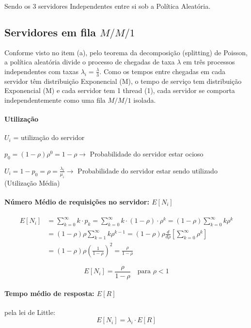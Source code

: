 \documentclass[conference]{IEEE_Conference_Template/IEEEtran}
\begin{document}
Sendo os 3 servidores Independentes entre si sob a Política Aleatória.

\subsection{Servidores em fila $M / M / 1$}

Conforme visto no item (a), pelo teorema da decomposição (splitting) de Poisson, a política aleatória divide o processo de chegadas de taxa $\lambda$ em três processos independentes com taxas $\lambda_i = \frac{\lambda}{3}$. Como os tempos entre chegadas em cada servidor têm distribuição Exponencial (M), o tempo de serviço tem distribuição Exponencial (M) e cada servidor tem 1 thread (1), cada servidor se comporta independentemente como uma fila $M/M/1$ isolada.

\paragraph{Utilização}
$U_i$ = utilização do servidor

$p_0 = (1 - \rho)\rho^0 = 1 - \rho \to$ Probabilidade do servidor estar ocioso

$U_i = 1 - p_0 = \rho = \frac{\lambda_i}{\mu_i} \to$ Probabilidade do servidor estar sendo utilizado (Utilização Média)

\paragraph{Número Médio de requisições no servidor: $E[N_i]$}
\begin{align}
E[N_i] &= \sum_{k=0}^{\infty} k \cdot p_k = \sum_{k=0}^{\infty} k \cdot (1 - \rho) \cdot \rho^k = (1 - \rho) \sum_{k=0}^{\infty} k \rho^k \nonumber\\
&= (1 - \rho)\rho \sum_{k=1}^{\infty} k \rho^{k-1} = (1 - \rho)\rho \frac{d}{d\rho} \left[ \sum_{k=0}^{\infty} \rho^k \right] \nonumber\\
&= (1 - \rho)\rho \left( \frac{1}{1-\rho} \right)^2 = \frac{\rho}{1 - \rho}
\end{align}

\begin{equation}
E[N_i] = \frac{\rho}{1 - \rho} \quad \text{para } \rho < 1
\end{equation}

\paragraph{Tempo médio de resposta: $E[R]$}
pela lei de Little:
\begin{equation}
E[N_i] = \lambda_i \cdot E[R]
\end{equation}
\end{document}
